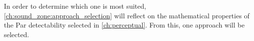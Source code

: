 In order to determine which one is most suited, \autoref{ch:sound_zone:approach_selection} will reflect on the mathematical 
properties of the 
Par detectability selected in \autoref{ch:perceptual}.
From this, one approach will be selected.





